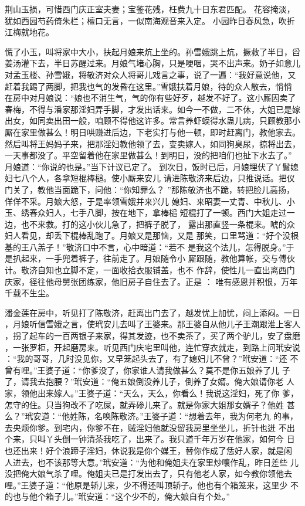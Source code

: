 荆山玉损，可惜西门庆正室夫妻；宝鉴花残，枉费九十日东君匹配。
花容掩淡，犹如西园芍药倚朱栏；檀口无言，一似南海观音来入定。
小园昨日春风急，吹折江梅就地花。

慌了小玉，叫将家中大小，扶起月娘来炕上坐的。孙雪娥跳上炕，撅救了半日，舀
姜汤灌下去，半日苏醒过来。月娘气堵心胸，只是哽咽，哭不出声来。奶子如意儿
对孟玉楼、孙雪娥，将敬济对众人将哥儿戏言之事，说了一遍：“我好意说他，又
赶着我踢了两脚，把我也气的发昏在这里。”雪娥扶着月娘，待的众人散去，悄悄
在房中对月娘说：“娘也不消生气，气的你有些好歹，越发不好了。这小厮因卖了
春梅，不得与潘家那淫妇弄手脚，才发出话来。如今一不做，二不休，大姐已是嫁
出女，如同卖出田一般，咱顾不得他这许多。常言养虾蟆得水蛊儿病，只顾教那小
厮在家里做甚么！明日哄赚进后边，下老实打与他一顿，即时赶离门，教他家去。
然后叫将王妈妈子来，把那淫妇教他领了去，变卖嫁人，如同狗臭尿，掠将出去，
一天事都没了。平空留着他在家里做甚么！到明日，没的把咱们也扯下水去了。”
月娘道：“你说的也是。”当下计议已定了。
到次日，饭时已后，月娘埋伏了丫鬟媳妇七八个人，各拿短棍棒槌。使小厮来安儿
请进陈敬济来后边，只推说话。把仪门关了，教他当面跪下，问他：“你知罪么？
”那陈敬济也不跪，转把脸儿高扬，佯佯不采。月娘大怒，于是率领雪娥并来兴儿
媳妇、来昭妻一丈青、中秋儿、小玉、绣春众妇人，七手八脚，按在地下，拿棒槌
短棍打了一顿。西门大姐走过一边，也不来救。打的这小伙儿急了，把裤子脱了，
露出那直竖一条棍来。唬的众妇人看见，却丢下棍棒乱跑了。月娘又是那恼，又是
那笑，口里骂道：“好个没根基的王八羔子！”敬济口中不言，心中暗道：“若不
是我这个法儿，怎得脱身。”于是扒起来，一手兜着裤子，往前走了。月娘随令小
厮跟随，教他算帐，交与傅伙计。敬济自知也立脚不定，一面收拾衣服铺盖，也不
作辞，使性儿一直出离西门庆家，径往他母舅张团练家，他旧房子自住去了。正是
：
唯有感恩并积恨，万年千载不生尘。

潘金莲在房中，听见打了陈敬济，赶离出门去了，越发忧上加忧，闷上添闷。一日
，月娘听信雪娥之言，使玳安儿去叫了王婆来。那王婆自从他儿子王潮跟淮上客人
，拐了起车的一百两银子来家，得其发迹，也不卖茶了，买了两个驴儿，安了盘磨
，一张罗柜，开起磨房来。听见西门庆宅里叫他，连忙穿衣就走，到路上问玳安说
：“我的哥哥，几时没见你，又早笼起头去了，有了媳妇儿不曾？”玳安道：“还
不曾有哩。”王婆子道：“你爹没了，你家谁人请我做甚么？莫不是你五娘养了儿
子了，请我去抱腰？”玳安道：“俺五娘倒没养儿子，倒养了女婿。俺大娘请你老
人家，领他出来嫁人。”王婆子道：“天么，天么，你看么！我说这淫妇，死了你
爹，怎守的住。只当狗改不了吃屎，就弄碜儿来了。就是你家大姐那女婿子？他姓
甚么？”玳安道：“他姓陈，名唤陈敬济。”王婆子道：“想着去年，我为何老九
的事，去央烦你爹。到宅内，你爹不在，贼淫妇他就没留我房里坐坐儿，折针也迸
不出个来，只叫丫头倒一钟清茶我吃了，出来了。我只道千年万岁在他家，如何今
日也还出来！好个浪蹄子淫妇，休说我是你个媒王，替你作成了恁好人家，就是闲
人进去，也不该那等大意。”玳安道：“为他和俺姐夫在家里炒嚷作乱，昨日差些
儿没把俺大娘气杀了哩。俺姐夫已是打发出去了，只有他老人家，如今教你领他去
哩。”王婆子道：“他原是轿儿来，少不得还叫顶轿子。他也有个箱笼来，这里少
不的也与他个箱子儿。”玳安道：“这个少不的，俺大娘自有个处。”

